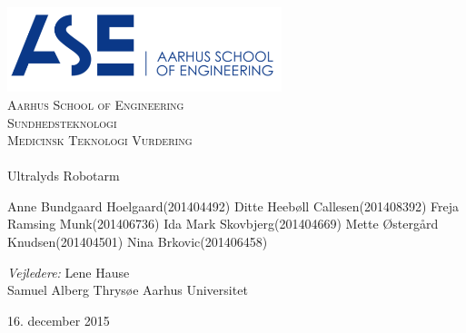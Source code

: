 \begin{titlingpage}
\begin{center}
~ \\[3cm]

\includegraphics[width=0.6\textwidth]{figurer/ASE}~\\[1cm]

\textsc{\LARGE Aarhus School of Engineering}\\[1.5cm]

\textsc{\Large Sundhedsteknologi}\\
\textsc{\Large Medicinsk Teknologi Vurdering }\\[0.5cm]

\noindent\makebox[\linewidth]{\rule{\textwidth}{0.4pt}}\\
[0.5cm]{\Huge Ultralyds Robotarm}
\noindent\makebox[\linewidth]{\rule{\textwidth}{0.4pt}}

\end{center}

Anne Bundgaard Hoelgaard\tab(201404492) \newline
Ditte Heebøll Callesen\tab(201408392) \newline
Freja Ramsing Munk\tab(201406736) \newline
Ida Mark Skovbjerg\tab(201404669) \newline	
Mette Østergård Knudsen\tab(201404501) \newline 
Nina Brkovic\tab(201406458) \newline 


\textit{Vejledere:} \newline
Lene Hause\\
Samuel Alberg Thrysøe
Aarhus Universitet

\vfill

\begin{center}
{\large 16. december 2015}
\end{center}

\end{titlingpage}